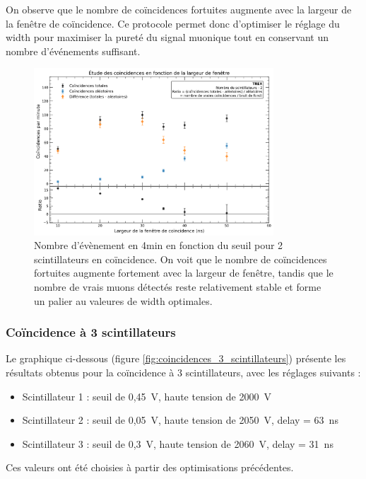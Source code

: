 \documentclass[a4paper,12pt,twoside]{article}
\begin{document}
On observe que le nombre de coïncidences fortuites augmente avec la largeur de la fenêtre de coïncidence. Ce protocole permet donc d’optimiser le réglage du width pour maximiser la pureté du signal muonique tout en conservant un nombre d’événements suffisant.


\begin{figure}[H]
    \centering
    \includegraphics[width=0.8\textwidth]{Images/Coincidences_2_Scintillateurs.png}
    \caption[Nombre d’évènement en 4 min en fonction du seuil]{Nombre d’évènement en 4min en fonction du seuil pour 2 scintillateurs en coïncidence.
    On voit que le nombre de coïncidences fortuites augmente fortement avec la largeur de fenêtre, tandis que le nombre de vrais muons détectés reste relativement stable et forme un palier au valeures de width optimales.}
    \label{fig:coincidences_2_scintillateurs}
\end{figure}

\newpage

\subsubsection{Coïncidence à 3 scintillateurs}

Le graphique ci-dessous (figure \ref{fig:coincidences_3_scintillateurs}) présente les résultats obtenus pour la coïncidence à 3 scintillateurs, avec les réglages suivants :
\begin{itemize}
    \item Scintillateur 1 : seuil de 0{,}45~V, haute tension de 2000~V
    \item Scintillateur 2 : seuil de 0{,}05~V, haute tension de 2050~V, delay = 63~ns
    \item Scintillateur 3 : seuil de 0{,}3~V, haute tension de 2060~V, delay = 31~ns
\end{itemize}
Ces valeurs ont été choisies à partir des optimisations précédentes.
\end{document}
